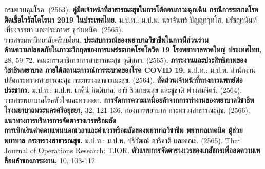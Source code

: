 
\begin{thebibliography}{99}

    กรมควบคุมโรค. (2563). \textbf{คู่มือเจ้าหน้าที่สาธารณะสุขในการโต้ตอบภาวะฉุกเฉิน กรณีการระบาดโรคติดเชื้อไวรัสโคโรนา 2019 ในประเทศไทย.} ม.ป.ท.: ม.ป.พ.
    นราจันทร์ ปัญญาวุทโส, ปรัชญานันท์ เที่ยงจรรยา และประภาพร ชูกำเหนิด. (2565). \\วารสารมหาวิทยาลัยคริสเตียน. \textbf{ประสบการณ์ของพยาบาลวิชาชีพในการมีส่วนร่วม\\ด้านความปลอดภัยในภาวะวิกฤตของการแพร่ระบาดโรคโควิด 19 โรงพยาบาลหาดใหญ่ ประเทศไทย,} 28, 59-72.
    คณะกรรมาธิการการสาธารณะสุข วุฒิสภา. (2565). \textbf{ภาระงานและประสิทธิภาพของวิชาชีพพยาบาล ภายใต้สถานะการณ์การระบาดของโรค COVID 19.} ม.ป.ท.: ม.ป.พ.
    สำนักงานปลัดกระทรวงสาธารณะสุข กระทรวงสาธารณะสุข. (2564). \textbf{สัดส่วนเจ้าหน้าที่ทางการแพทย์ต่อประชากร.} ม.ป.ท.: ม.ป.พ.
    เกศินี กิตติบาล, อารี ชีวเกษมสุข และชูชาติ พ่วงสมจิตร์. (2564). วารสารพยาบาลโรคหัวใจและทรวงอก. \textbf{การจัดการความเหนื่อยล้าจากการทํางานของพยาบาลวิชาชีพ \\โรงพยาบาลพระนครศรีอยุธยา,} 32, 121-136.
    กองการพยาบาล กระทรวงสาธารณะสุข. (2566). \textbf{แนวทางการบริหารการจัดตารางเวรหรือผลัด \\การเบิกเงินค่าตอบแทนนอกเวลาและค่าเวรหรือผลัดของพยาบาลวิชาชีพ พยาบาลเทคนิค ผู้ช่วยพยาบาล กระทรวงสาธารณสุข.} ม.ป.ท.: ม.ป.พ.
    ปริวัฒณ์ อารีชาติ และคณะ. (2565). Thai Journal of Operations Research: TJOR. \textbf{ตัวแบบการจัดตารางเวรของเภสัชกรเพื่อลดความเหลื่อมล้ําของภาระงาน,} 10, 103-112
\end{thebibliography}